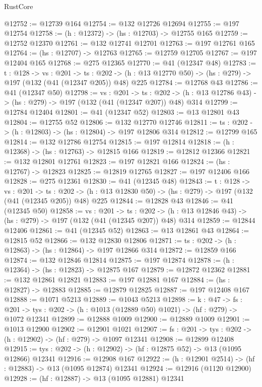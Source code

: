 \begin{lexlean}{RustCore}
\begin{coremodule}
@12752 := @12739 @164
@12754 := @132 @12726 @12694
@12755 := @197 @12754
@12758 := (h : @12372) -> (hs : @12703) -> @12755 @165
@12759 := @12752 @12370
@12761 := @132 @12741 @12701
@12763 := @197 @12761 @165
@12764 := (hs : @12707) -> @12763
@12765 := @12759 @12705
@12767 := @197 @12404 @165
@12768 := @275 @12365
@12770 := @41 (@12347 @48)
@12783 := {t : @128} ->
  {vs : @201} ->
  {ts : @202} -> (h : @13 @12770 @50) -> (hs : @279) -> @197 (@132 (@41 (@12347 @205)) @48) @225
@12784 := @12768 @43
@12786 := @41 (@12347 @50)
@12798 := {vs : @201} ->
  {ts : @202} -> (h : @13 @12786 @43) -> (hs : @279) -> @197 (@132 (@41 (@12347 @207)) @48) @314
@12799 := @12784 @12404
@12801 := @41 (@12347 @52)
@12803 := @13 @12801 @43
@12804 := @12755 @52
@12806 := @132 @12770 @12746
@12811 := {ts : @202} -> (h : @12803) -> (hs : @12804) -> @197 @12806 @314
@12812 := @12799 @165
@12814 := @132 @12786 @12754
@12815 := @197 @12814
@12818 := (h : @12368) -> (hs : @12763) -> @12815 @166
@12819 := @12812 @12366
@12821 := @132 @12801 @12761
@12823 := @197 @12821 @166
@12824 := (hs : @12767) -> @12823
@12825 := @12819 @12765
@12827 := @197 @12406 @166
@12828 := @275 @12361
@12830 := @41 (@12345 @48)
@12843 := {t : @128} ->
  {vs : @201} ->
  {ts : @202} -> (h : @13 @12830 @50) -> (hs : @279) -> @197 (@132 (@41 (@12345 @205)) @48) @225
@12844 := @12828 @43
@12846 := @41 (@12345 @50)
@12858 := {vs : @201} ->
  {ts : @202} -> (h : @13 @12846 @43) -> (hs : @279) -> @197 (@132 (@41 (@12345 @207)) @48) @314
@12859 := @12844 @12406
@12861 := @41 (@12345 @52)
@12863 := @13 @12861 @43
@12864 := @12815 @52
@12866 := @132 @12830 @12806
@12871 := {ts : @202} -> (h : @12863) -> (hs : @12864) -> @197 @12866 @314
@12872 := @12859 @166
@12874 := @132 @12846 @12814
@12875 := @197 @12874
@12878 := (h : @12364) -> (hs : @12823) -> @12875 @167
@12879 := @12872 @12362
@12881 := @132 @12861 @12821
@12883 := @197 @12881 @167
@12884 := (hs : @12827) -> @12883
@12885 := @12879 @12825
@12887 := @197 @12408 @167
@12888 := @1071 @5213
@12889 := @1043 @5213
@12898 := {k : @47} ->
  {fs : @201} -> {tys : @202} -> (h : @1013 (@12889 @50) @1021) -> (hf : @279) -> @1072 @12341
@12899 := @12888 @1009
@12900 := @12889 @1009
@12901 := @1013 @12900
@12902 := @12901 @1021
@12907 := {fs : @201} -> {tys : @202} -> (h : @12902) -> (hf : @279) -> @1097 @12341
@12908 := @12899 @12408
@12915 := {tys : @202} -> (h : @12902) -> (hf : @12875 @52) -> @13 (@1095 @12866) @12341
@12916 := @12908 @167
@12922 := (h : @12901 @2514) -> (hf : @12883) -> @13 (@1095 @12874) @12341
@12924 := @12916 (@1120 @12900)
@12928 := (hf : @12887) -> @13 (@1095 @12881) @12341

\end{coremodule}
\end{lexlean}

